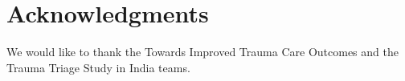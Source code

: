 \documentclass[10pt,letterpaper]{article}\usepackage[]{graphicx}\usepackage[]{color}
\begin{document}
\section*{Acknowledgments}
We would like to thank the Towards Improved Trauma Care Outcomes and the Trauma
Triage Study in India teams.

\nolinenumbers

%
%
% 

\end{document}
